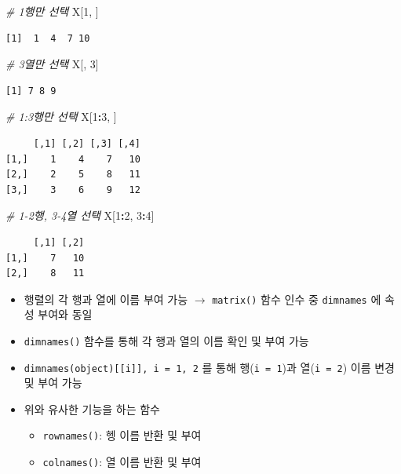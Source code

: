 \documentclass[
  11pt,
]{krantz}
\newenvironment{Shaded}{\begin{snugshade}}{\end{snugshade}}
\newcommand{\CommentTok}[1]{\textcolor[rgb]{0.37,0.37,0.37}{\textit{#1}}}
\newcommand{\DecValTok}[1]{\textcolor[rgb]{0.06,0.06,0.06}{#1}}
\newcommand{\NormalTok}[1]{#1}
\newcommand{\OperatorTok}[1]{\textcolor[rgb]{0.43,0.43,0.43}{\textbf{#1}}}
\providecommand{\tightlist}{%
  \setlength{\itemsep}{0pt}\setlength{\parskip}{0pt}}
\begin{document}
\begin{Shaded}
\begin{Highlighting}[]
\CommentTok{# 1행만 선택}
\NormalTok{X[}\DecValTok{1}\NormalTok{, ]}
\end{Highlighting}
\end{Shaded}

\begin{verbatim}
[1]  1  4  7 10
\end{verbatim}

\begin{Shaded}
\begin{Highlighting}[]
\CommentTok{# 3열만 선택}
\NormalTok{X[, }\DecValTok{3}\NormalTok{]}
\end{Highlighting}
\end{Shaded}

\begin{verbatim}
[1] 7 8 9
\end{verbatim}

\begin{Shaded}
\begin{Highlighting}[]
\CommentTok{# 1:3행만 선택}
\NormalTok{X[}\DecValTok{1}\OperatorTok{:}\DecValTok{3}\NormalTok{, ]}
\end{Highlighting}
\end{Shaded}

\begin{verbatim}
     [,1] [,2] [,3] [,4]
[1,]    1    4    7   10
[2,]    2    5    8   11
[3,]    3    6    9   12
\end{verbatim}

\begin{Shaded}
\begin{Highlighting}[]
\CommentTok{# 1-2행, 3-4열 선택}
\NormalTok{X[}\DecValTok{1}\OperatorTok{:}\DecValTok{2}\NormalTok{, }\DecValTok{3}\OperatorTok{:}\DecValTok{4}\NormalTok{]}
\end{Highlighting}
\end{Shaded}

\begin{verbatim}
     [,1] [,2]
[1,]    7   10
[2,]    8   11
\end{verbatim}

\normalsize

\begin{itemize}
\tightlist
\item
  행렬의 각 행과 열에 이름 부여 가능 \(\rightarrow\) \texttt{matrix()} 함수 인수 중 \texttt{dimnames} 에 속성 부여와 동일
\item
  \texttt{dimnames()} 함수를 통해 각 행과 열의 이름 확인 및 부여 가능
\item
  \texttt{dimnames(object){[}{[}i{]}{]},\ i\ =\ 1,\ 2} 를 통해 행(\texttt{i\ =\ 1})과 열(\texttt{i\ =\ 2}) 이름 변경 및 부여 가능
\item
  위와 유사한 기능을 하는 함수

  \begin{itemize}
  \tightlist
  \item
    \texttt{rownames()}: 헹 이름 반환 및 부여
  \item
    \texttt{colnames()}: 열 이름 반환 및 부여
  \end{itemize}
\end{itemize}
\end{document}

